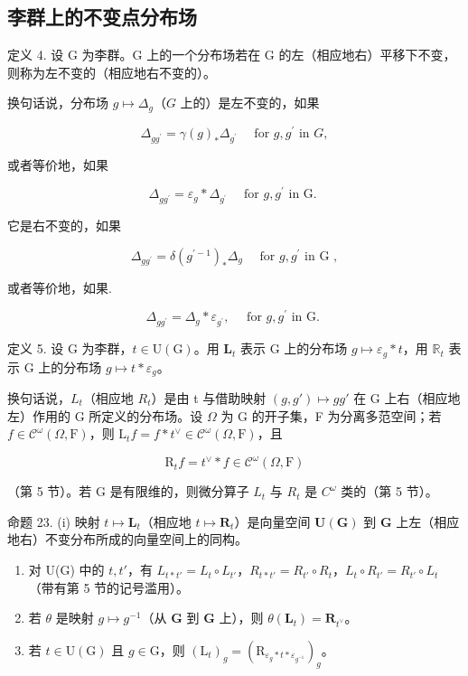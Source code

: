 \subsection{李群上的不变点分布场}

定义 4. 设 G 为李群。G 上的一个分布场若在 G 的左（相应地右）平移下不变，则称为左不变的（相应地右不变的）。

换句话说，分布场 \(g \mapsto \Delta_g\)（\(G\) 上的）是左不变的，如果

\[
\Delta_ {g g ^ {\prime}} = \gamma (g) _ {*} \Delta_ {g ^ {\prime}} \quad \text { for } g, g ^ {\prime} \text { in } G,
\]

或者等价地，如果

\[
\Delta_ {g g ^ {\prime}} = \varepsilon_ {g} * \Delta_ {g ^ {\prime}} \quad \text { for   } g, g ^ {\prime} \text {   in   G. }
\]

它是右不变的，如果

\[
\Delta_ {g g ^ {\prime}} = \delta (g ^ {\prime - 1}) _ {*} \Delta_ {g} \quad \text { for   } g, g ^ {\prime} \text {   in   G },
\]

或者等价地，如果.

\[
\Delta_ {g g ^ {\prime}} = \Delta_ {g} * \varepsilon_ {g ^ {\prime}}, \quad \text { for   } g, g ^ {\prime} \text {   in   G. }
\]

定义 5. 设 G 为李群，\(t \in \mathrm{U}(\mathrm{G})\)。用 \(\mathbf{L}_t\) 表示 G 上的分布场 \(g \mapsto \varepsilon_g * t\)，用 \(\mathbb{R}_t\) 表示 G 上的分布场 \(g \mapsto t * \varepsilon_g\)。

换句话说，\(L_{t}\)（相应地 \(R_{t}\)）是由 t 与借助映射 \((g, g') \mapsto gg'\) 在 G 上右（相应地左）作用的 G 所定义的分布场。设 \(\Omega\) 为 G 的开子集，F 为分离多范空间；若 \(f \in \mathcal{C}^{\omega}(\Omega, \mathrm{F})\)，则 \(\mathrm{L}_{t}f = f * t^{\vee} \in \mathcal{C}^{\omega}(\Omega, \mathrm{F})\)，且

\[
\mathrm{R} _ {t} f = t ^ {\vee} * f \in \mathcal {C} ^ {\omega} (\Omega , \mathrm{F})
\]

（第 5 节）。若 G 是有限维的，则微分算子 \(L_{t}\) 与 \(R_{t}\) 是 \(C^{\omega}\) 类的（第 5 节）。

命题 23. (i) 映射 \(t \mapsto \mathbf{L}_t\)（相应地 \(t \mapsto \mathbf{R}_t\)）是向量空间 \(\mathbf{U}(\mathbf{G})\) 到 \(\mathbf{G}\) 上左（相应地右）不变分布所成的向量空间上的同构。

\begin{enumerate}
\def\labelenumi{(\roman{enumi})}
\setcounter{enumi}{1}
\item
  对 U(G) 中的 \(t, t'\)，有 \(L_{t*t'} = L_t \circ L_{t'}\)，\(R_{t*t'} = R_{t'} \circ R_t\)，\(L_t \circ R_{t'} = R_{t'} \circ L_t\)（带有第 5 节的记号滥用）。
\item
  若 \(\theta\) 是映射 \(g \mapsto g^{-1}\)（从 \(\mathbf{G}\) 到 \(\mathbf{G}\) 上），则 \(\theta(\mathbf{L}_t) = \mathbf{R}_{t^{\vee}}\)。
\item
  若 \(t \in \mathrm{U}(\mathrm{G})\) 且 \(g \in \mathrm{G}\)，则 \((\mathrm{L}_t)_g = (\mathrm{R}_{\varepsilon_g * t * \varepsilon_{g^{-1}}})_g\)。
\end{enumerate}

